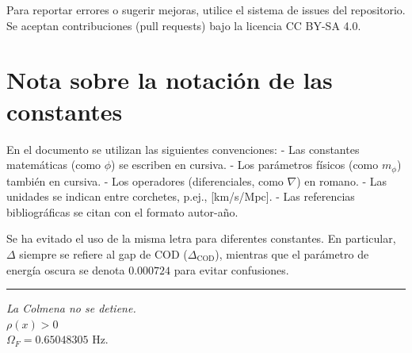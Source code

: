 \documentclass[12pt, a4paper]{article}
\theoremstyle{miuThm}
\theoremstyle{remark}
\newcommand{\eps}{0.000724}
\begin{document}
Para reportar errores o sugerir mejoras, utilice el sistema de issues del repositorio. Se aceptan contribuciones (pull requests) bajo la licencia CC BY-SA 4.0.

\clearpage
\section{Nota sobre la notación de las constantes}

En el documento se utilizan las siguientes convenciones:
- Las constantes matemáticas (como $\phi$) se escriben en cursiva.
- Los parámetros físicos (como $m_\phi$) también en cursiva.
- Los operadores (diferenciales, como $\nabla$) en romano.
- Las unidades se indican entre corchetes, p.ej., [km/s/Mpc].
- Las referencias bibliográficas se citan con el formato autor-año.

Se ha evitado el uso de la misma letra para diferentes constantes. En particular, $\Delta$ siempre se refiere al gap de COD ($\Delta_{\text{COD}}$), mientras que el parámetro de energía oscura se denota $\eps$ para evitar confusiones.

\vspace{1cm}
\begin{center}
\rule{0.6\linewidth}{0.4pt}
\vspace{0.5cm}
\textit{La Colmena no se detiene.} \\
$\rho(x) > 0$ \\
$\Omega_F = 0.65048305$ Hz.
\end{center}
\end{document}

